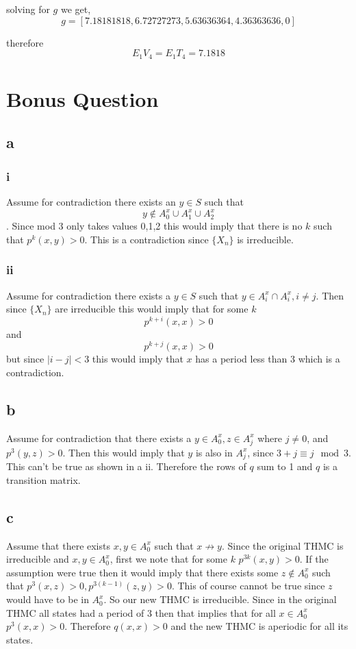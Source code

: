 \documentclass{article}
\begin{document}
solving for $g$ we get, 
\[
g = [ 7.18181818,  6.72727273,  5.63636364,  4.36363636,0]
\]

therefore
\[
E_1V_4 = E_1T_4 = 7.1818
\]

\section*{Bonus Question}
\subsection*{a}
\subsubsection*{i}
Assume for contradiction there exists an $y \in S$
such that 
\[
y \not\in A^x_0 \cup A^x_1 \cup A^x_2
\] 
. Since mod 3 only takes values 0,1,2 this would imply that there is no $k$ such that $p^k(x,y) > 0$. This is a contradiction since $\{X_n\}$ is irreducible.

\subsubsection*{ii}
Assume for contradiction there exists a $y \in S$ such that
$y \in A^x_i \cap A^x_i, i \neq j$. 
Then since $\{X_n\}$ are irreducible this would imply that for some $k$
\[
p^{k+i}(x,x) > 0
\]
and
\[
p^{k + j }(x,x) > 0
\]
but since $|i-j| < 3$ this would imply that $x$ has a period less than 3 which is a contradiction.

\subsection*{b} 

Assume for contradiction that there exists a $y \in A^x_0, z \in A^x_j$ where $j \neq 0$, and $p^3(y,z) > 0$. Then this would imply that $y$ is also in $A^x_j$, since $3 + j \equiv j \mod 3$. This can't be true as shown in a ii. Therefore the rows of $q$ sum to 1 and $q$ is a transition matrix.

\subsection*{c}
Assume that there exists $x,y \in A^x_0$ such that $x \not\rightarrow y$. Since the original THMC is irreducible and $x,y \in A^x_0$, first we note that for some $k$ $p^{3k}(x,y) > 0$. If the assumption were true then it would imply that there exists some $z \not\in A^x_0$ such that $p^3(x,z) >0, p^{3(k-1)}(z,y) >0$. This of course cannot be true since $z$ would have to be in $A^x_0$. So our new THMC is irreducible. Since in the original THMC all states had a period of 3 then that implies that for all $x \in A^x_0$ $p^3(x,x) > 0 $. Therefore $q(x,x) > 0 $ and the new THMC is aperiodic for all its states.
\end{document}
